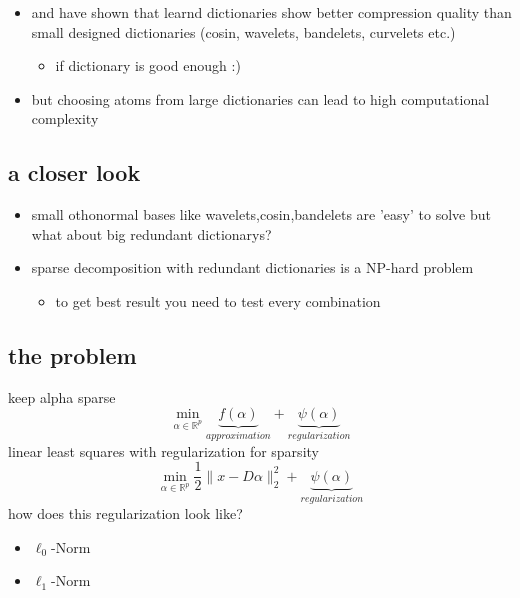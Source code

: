 \begin{frame}
\begin{itemize}
\item \cite{Chen1998Atomic} and \cite{Aharon2006KSVD} have shown that learnd dictionaries show better compression quality
than small designed dictionaries (cosin, wavelets, bandelets, curvelets etc.)
\pause
		\begin{itemize}
		\item if dictionary is good enough :)
  		\end{itemize}
\pause
\item but choosing atoms from large dictionaries can lead to high computational complexity
\end{itemize}
\end{frame}

\subsection{a closer look}
\begin{frame}
\begin{itemize}
\item small othonormal bases like wavelets,cosin,bandelets are 'easy' to solve but what about big redundant dictionarys?
\pause
\item sparse decomposition with redundant dictionaries is a NP-hard problem
\begin{itemize}
\item to get best result you need to test every combination
\end{itemize}
\end{itemize}
\end{frame}






\subsection{the problem}
\begin{frame}
keep alpha sparse
\[ 
\min_{\alpha\in\mathbb{R}^{p}} \underbrace{f(\alpha)}_{approximation} + \underbrace{\psi(\alpha)}_{regularization} 
\]
\pause
linear least squares with regularization for sparsity 
\[
\min_{\alpha\in\mathbb{R}^{p}} \frac{1}{2} \lVert x - D\alpha \rVert^{2}_{2} + \underbrace{\psi(\alpha)}_{regularization}
\] 
how does this regularization look like? 
\begin{itemize}
\item $\ell_0$-Norm 
\item $\ell_1$-Norm
\end{itemize}


\end{frame}

